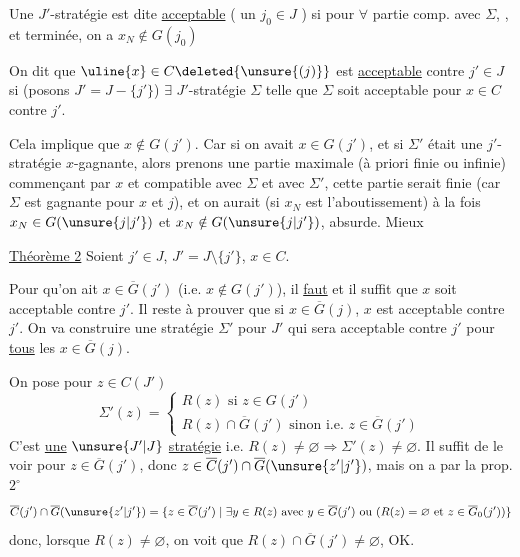 Une  $J'$-stratégie  est dite \uline{acceptable} ( un $j_0\in J$ ) si pour $\forall$ partie  comp. avec $\Sigma$, , et terminée, on a $x_N\notin G(j_0)$

On dit que $\uline{x}\in C\deleted{\unsure{(j)}}$ est \uline{acceptable} contre $j'\in J$ si \deleted{$\exists$} (posons $J'=J-\{j'\}$)  $\exists$ $J'$-stratégie $\Sigma$ telle que $\Sigma$ soit acceptable pour $x\in C$ contre $j'$.

Cela implique que $x\notin G(j')$. Car si on avait $x\in G(j')$,  et si $\Sigma'$ était une $j'$-stratégie $x$-gagnante, alors prenons une partie maximale (à priori finie ou infinie) commençant par $x$ et compatible avec $\Sigma$ et avec $\Sigma'$, cette partie serait finie (car $\Sigma$ est gagnante pour $x$ et $j$), et on aurait (si $x_N$ est l'aboutissement) à la fois $x_N\in G(\unsure{j|j'})$ et $x_N\notin G(\unsure{j|j'})$, absurde. Mieux

\uline{Théorème 2} Soient $j'\in J$, $J'=J\setminus\{j'\}$, $x\in C$.

Pour qu'on ait $x\in\overline G(j')$ (i.e. $x\notin G(j')$), il \uline{faut} et il suffit que $x$ soit acceptable contre $j'$.
Il reste à prouver que si $x\in\overline G(j)$,  $x$ est acceptable contre $j'$. On va construire une stratégie $\Sigma'$ pour $J'$ qui sera acceptable  contre $j'$ pour \uline{tous} les $x\in\overline G(j)$.

On pose pour $z\in C(J')$
\[
\Sigma'(z)=\begin{cases}R(z)\text{ si }z\in G(j')\\R(z)\cap\overline G(j')\text{ sinon i.e. }z\in\overline G(j')\end{cases}
\]
C'est \uline{une} $\unsure{J'|J}$ \uline{stratégie} i.e. $R(z)\ne\varnothing\Longrightarrow\Sigma'(z)\ne\varnothing$. Il suffit de le voir pour $z\in\overline G(j')$, donc $z\in\overline C(j')\cap\overline G(\unsure{z'|j'})$, mais on a par la prop. $2^\circ$
\[
\overline C(j')\cap\overline G(\unsure{z'|j'})=\{z\in\overline C(j')\mid\exists y\in R(z)\text{ avec }y\in\overline G(j')\text{ ou }(R(z)=\varnothing\text{ et }z\in\overline G_0(j'))\}
\]
donc, lorsque $R(z)\ne\varnothing$, on voit que $R(z)\cap\overline G(j')\ne\varnothing$, OK.

